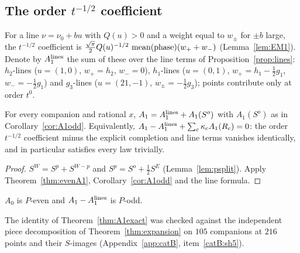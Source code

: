 \subsection{The order $t^{-1/2}$ coefficient}
For a line $\nu=\nu_0+bu$ with $Q(u)>0$ and a weight equal to $w_\pm$ for $\pm b$ large, the $t^{-1/2}$ coefficient is $\frac{\sqrt\pi}2Q(u)^{-1/2}\,\operatorname{mean}(\text{phase})(w_++w_-)$
(Lemma~\ref{lem:EM1}). Denote by $A_1^{\rm lines}$ the sum of these over the line terms of Proposition~\ref{prop:lines}: $h_2$-lines ($u=(1,0)$, $w_+=h_2$, $w_-=0$),
$h_1$-lines ($u=(0,1)$, $w_+=h_1-\frac12g_1$, $w_-=-\frac12g_1$) and $g_3$-lines ($u=(21,-1)$, $w_\pm=-\frac12g_3$); points contribute only at order $t^0$.
\begin{theorem}\label{thm:A1exact}
For every companion and rational $x$, $A_1=A_1^{\rm lines}+A_1(S^o)$ with $A_1(S^o)$ as in Corollary~\ref{cor:A1odd}. Equivalently,
$A_1-A_1^{\rm lines}+\sum_c\kappa_cA_1(R_c)=0$: the order $t^{-1/2}$ coefficient minus the explicit completion and line terms vanishes identically, and in particular
satisfies every law trivially.
\end{theorem}
\begin{proof}
$S^W=S^p+S^{W-p}$ and $S^p=S^o+\frac12S^E$ (Lemma~\ref{lem:psplit}). Apply Theorem~\ref{thm:evenA1}, Corollary~\ref{cor:A1odd} and the line formula.
\end{proof}
\begin{corollary}\label{cor:A1parity}
$A_0$ is $P$-even and $A_1-A_1^{\rm lines}$ is $P$-odd.
\end{corollary}
\begin{catbremark}
The identity of Theorem~\ref{thm:A1exact} was checked against the independent piece decomposition of Theorem~\ref{thm:expansion} on $105$ companions at $216$ points and
their $S$-images (Appendix~\ref{app:catB}, item~\ref{catB:sh5}).
\end{catbremark}
